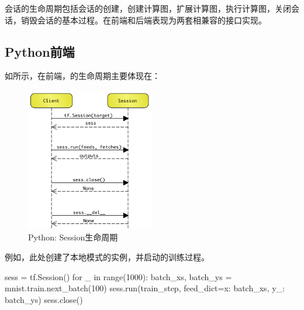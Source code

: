 \begin{content}

会话的生命周期包括会话的创建，创建计算图，扩展计算图，执行计算图，关闭会话，销毁会话的基本过程。在前端和后端\cpp{}表现为两套相兼容的接口实现。

\subsection{Python前端}

如所示，在前端，的生命周期主要体现在：

\begin{enum}
    \begin{enum}
    \end{enum}
\end{enum}

\begin{figure}[H]
\centering
\includegraphics[width=0.5\textwidth]{figures/py-session-lifecycle.png}
\caption{Python: Session生命周期}
 \label{fig:py-session-lifecycle}
\end{figure}

例如，此处创建了本地模式的实例，并启动的训练过程。

\begin{leftbar}
\begin{python}
sess = tf.Session()
for _ in range(1000):
  batch_xs, batch_ys = mnist.train.next_batch(100)
  sess.run(train_step, feed_dict={x: batch_xs, y_: batch_ys})
sess.close()
\end{python}
\end{leftbar}


\end{content}
